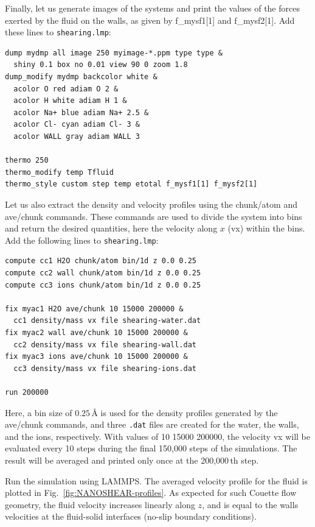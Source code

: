 \documentclass[9pt,tutorial]{livecoms}
\newcommand{\lmpcmd}[1]{\hspace{0pt}\colorbox{listing}{\textcolor{command}{\small{#1}}}\hspace{0pt}} %
\newcommand{\flecmd}[1]{\textcolor{command}{\texttt{#1}}} %
\begin{document}
Finally, let us generate images of the systems and print the values of the
forces exerted by the fluid on the walls, as given by \lmpcmd{f\_mysf1[1]}
and \lmpcmd{f\_mysf2[1]}.  Add these lines to \flecmd{shearing.lmp}:
\begin{lstlisting}
dump mydmp all image 250 myimage-*.ppm type type &
  shiny 0.1 box no 0.01 view 90 0 zoom 1.8
dump_modify mydmp backcolor white &
  acolor O red adiam O 2 &
  acolor H white adiam H 1 &
  acolor Na+ blue adiam Na+ 2.5 &
  acolor Cl- cyan adiam Cl- 3 &
  acolor WALL gray adiam WALL 3

thermo 250
thermo_modify temp Tfluid
thermo_style custom step temp etotal f_mysf1[1] f_mysf2[1]
\end{lstlisting}
Let us also extract the density and velocity profiles using
the \lmpcmd{chunk/atom} and \lmpcmd{ave/chunk} commands.  These commands are
used to divide the system into bins and return the desired quantities, here the velocity
along $x$ (\lmpcmd{vx}) within the bins.  Add the following lines to \flecmd{shearing.lmp}:
\begin{lstlisting}
compute cc1 H2O chunk/atom bin/1d z 0.0 0.25
compute cc2 wall chunk/atom bin/1d z 0.0 0.25
compute cc3 ions chunk/atom bin/1d z 0.0 0.25

fix myac1 H2O ave/chunk 10 15000 200000 &
  cc1 density/mass vx file shearing-water.dat
fix myac2 wall ave/chunk 10 15000 200000 &
  cc2 density/mass vx file shearing-wall.dat
fix myac3 ions ave/chunk 10 15000 200000 &
  cc3 density/mass vx file shearing-ions.dat

run 200000
\end{lstlisting}
Here, a bin size of $0.25\,\text{\AA{}}$ is used for the density
profiles generated by the \lmpcmd{ave/chunk} commands, and three
\flecmd{.dat} files are created for the water, the walls, and the ions,
respectively.  With values of \lmpcmd{10 15000 200000}, the velocity
\lmpcmd{vx} will be evaluated every 10 steps during the final 150,000
steps of the simulations.  The result will be averaged and printed only
once at the 200,000\,th step.

Run the simulation using LAMMPS.  The averaged velocity
profile for the fluid is plotted in Fig.~\ref{fig:NANOSHEAR-profiles}.
As expected for such Couette flow geometry, the fluid velocity increases
linearly along $z$, and is equal to the walls velocities at the fluid-solid
interfaces (no-slip boundary conditions).
\end{document}
